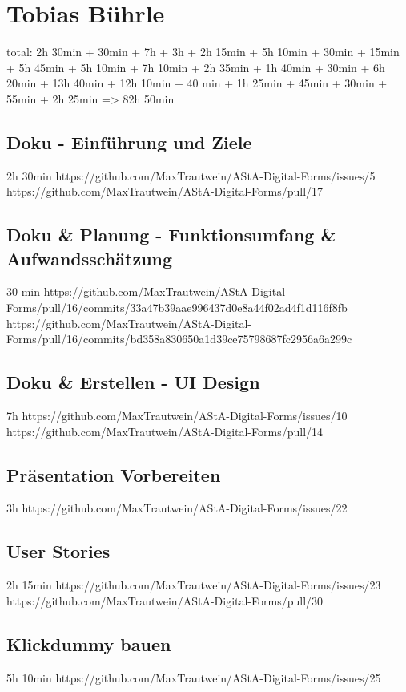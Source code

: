 \section{Tobias Bührle}\label{sec:tobias-buhrle}

total: 2h 30min + 30min + 7h + 3h + 2h 15min + 5h 10min + 30min + 15min + 5h 45min + 5h 10min + 7h 10min
+ 2h 35min + 1h 40min + 30min + 6h 20min + 13h 40min + 12h 10min + 40 min + 1h 25min + 45min + 30min + 55min
+ 2h 25min
=> 82h 50min

\subsection{Doku - Einführung und Ziele}
2h 30min
https://github.com/MaxTrautwein/AStA-Digital-Forms/issues/5
https://github.com/MaxTrautwein/AStA-Digital-Forms/pull/17
\subsection{Doku & Planung - Funktionsumfang & Aufwandsschätzung}
30 min
https://github.com/MaxTrautwein/AStA-Digital-Forms/pull/16/commits/33a47b39aae996437d0e8a44f02ad4f1d116f8fb
https://github.com/MaxTrautwein/AStA-Digital-Forms/pull/16/commits/bd358a830650a1d39ce75798687fc2956a6a299c

\subsection{Doku & Erstellen - UI Design}
7h
https://github.com/MaxTrautwein/AStA-Digital-Forms/issues/10
https://github.com/MaxTrautwein/AStA-Digital-Forms/pull/14

\subsection{Präsentation Vorbereiten}
3h
https://github.com/MaxTrautwein/AStA-Digital-Forms/issues/22
\subsection{User Stories}
2h 15min
https://github.com/MaxTrautwein/AStA-Digital-Forms/issues/23
https://github.com/MaxTrautwein/AStA-Digital-Forms/pull/30

\subsection{Klickdummy bauen}
5h 10min
https://github.com/MaxTrautwein/AStA-Digital-Forms/issues/25

